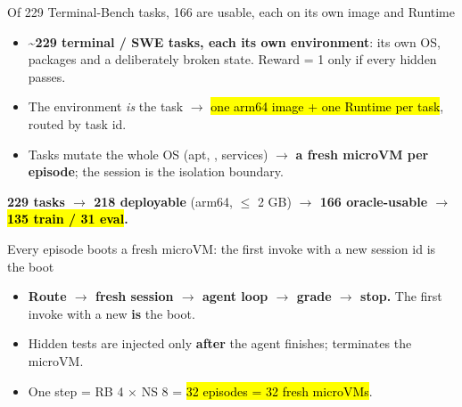 \begin{frame}{Of 229 Terminal-Bench tasks, 166 are usable, each on its own image and Runtime}
\begin{itemize}\footnotesize\setlength{\itemsep}{0.8mm}
\item \textbf{\textasciitilde229 terminal / SWE tasks, each its own environment}: its own OS, packages and a deliberately broken state. Reward = 1 only if every hidden  passes.
\item The environment \emph{is} the task $\rightarrow$ \hl{one arm64 image + one Runtime per task}, routed by task id.
\item Tasks mutate the whole OS (apt, , services) $\rightarrow$ \textbf{a fresh microVM per episode}; the session is the isolation boundary.
\end{itemize}
\vspace{1mm}
\centering
{}
\par\vspace{1.5mm}
{\footnotesize\textbf{229 tasks $\rightarrow$ 218 deployable} (arm64, $\le$ 2 GB) \textbf{$\rightarrow$ 166 oracle-usable $\rightarrow$ \hl{135 train / 31 eval}.}\par}
\end{frame}

\begin{frame}{Every episode boots a fresh microVM: the first invoke with a new session id is the boot}
\centering
{}
\par\vspace{2mm}
\raggedright
\begin{itemize}\footnotesize\setlength{\itemsep}{0.8mm}
\item \textbf{Route $\rightarrow$ fresh session $\rightarrow$ agent loop $\rightarrow$ grade $\rightarrow$ stop.} The first invoke with a new  \textbf{is} the boot.
\item Hidden tests are injected only \textbf{after} the agent finishes;  terminates the microVM.
\item One step = RB 4 $\times$ NS 8 = \hl{32 episodes = 32 fresh microVMs}.
\end{itemize}
\end{frame}

